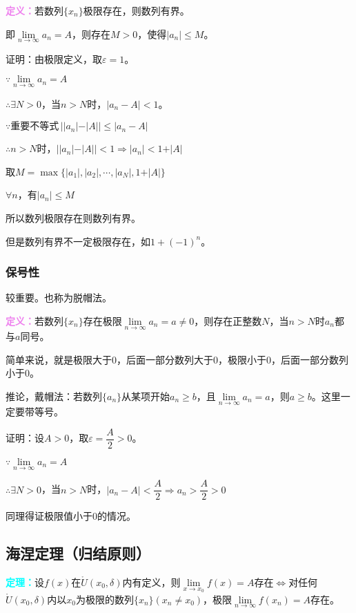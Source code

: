 \documentclass[UTF8, 12pt]{ctexart}
\begin{document}
\textcolor{violet}{\textbf{定义：}}若数列$\{x_n\}$极限存在，则数列有界。

即$\lim\limits_{n\to\infty}a_n=A$，则存在$M>0$，使得$\vert a_n\vert\leqslant M$。

证明：由极限定义，取$\varepsilon=1$。

$\because\lim\limits_{n\to\infty}a_n=A$

$\therefore\exists N>0$，当$n>N$时，$\vert a_n-A\vert<1$。

$\because\text{重要不等式}\,\vert\vert a_n\vert-\vert A\vert\vert\leqslant\vert a_n-A\vert$

$\therefore n>N$时，$\vert\vert a_n\vert-\vert A\vert\vert<1\Rightarrow\vert a_n\vert<1+\vert A\vert$

取$M=\max\{\vert a_1\vert,\vert a_2\vert,\cdots,\vert a_N\vert,1+\vert A\vert\}$

$\forall n$，有$\vert a_n\vert\leqslant M$

所以数列极限存在则数列有界。

但是数列有界不一定极限存在，如$1+(-1)^n$。

\subsubsection{保号性}

较重要。也称为脱帽法。

\textcolor{violet}{\textbf{定义：}}若数列$\{x_n\}$存在极限$\lim\limits_{n\to\infty}a_n=a\neq 0$，则存在正整数$N$，当$n>N$时$a_n$都与$a$同号。

简单来说，就是极限大于0，后面一部分数列大于0，极限小于0，后面一部分数列小于0。

推论，戴帽法：若数列$\{a_n\}$从某项开始$a_n\geqslant b$，且$\lim\limits_{n\to\infty}a_n=a$，则$a\geqslant b$。这里一定要带等号。

证明：设$A>0$，取$\varepsilon=\dfrac{A}{2}>0$。

$\because\lim\limits_{n\to\infty}a_n=A$

$\therefore\exists N>0$，当$n>N$时，$\vert a_n-A\vert<\dfrac{A}{2}\Rightarrow a_n>\dfrac{A}{2}>0$

同理得证极限值小于0的情况。

\subsection{海涅定理（归结原则）}

\textcolor{aqua}{\textbf{定理：}}设$f(x)$在$\mathring{U}(x_0,\delta)$内有定义，则$\lim\limits_{x\to x_0}f(x)=A$存在$\Leftrightarrow$对任何$\mathring{U}(x_0,\delta)$内以$x_0$为极限的数列$\{x_n\}(x_n\neq x_0)$，极限$\lim\limits_{n\to\infty}f(x_n)=A$存在。
\end{document}
